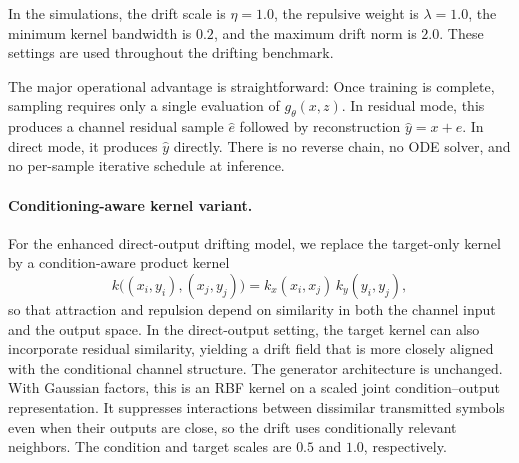 \documentclass[conference]{IEEEtran}
\begin{document}
In the simulations, the drift scale is \(\eta=1.0\), the repulsive weight is \(\lambda=1.0\), the minimum kernel bandwidth is \(0.2\), and the maximum drift norm is \(2.0\).
These settings are used throughout the drifting benchmark.

The major operational advantage is straightforward:
Once training is complete, sampling requires only a single evaluation of \(g_\theta(x,z)\).
In residual mode, this produces a channel residual sample \(\hat e\) followed by reconstruction \(\hat y=x+\hat e\). In direct mode, it produces \(\hat y\) directly.
There is no reverse chain, no ODE solver, and no per-sample iterative schedule at inference.

\paragraph{Conditioning-aware kernel variant.}
For the enhanced direct-output drifting model, we replace the target-only kernel by a condition-aware product kernel
  \[
  k\big((x_i,y_i),(x_j,y_j)\big)=k_x(x_i,x_j)\,k_y(y_i,y_j),
  \]
so that attraction and repulsion depend on similarity in both the channel input and the output space. In the direct-output setting, the target kernel can also incorporate residual similarity, yielding a drift field that is more closely aligned with the conditional channel structure. The generator architecture is unchanged.
With Gaussian factors, this is an RBF kernel on a scaled joint condition--output representation. It suppresses interactions between dissimilar transmitted symbols even when their outputs are close, so the drift uses conditionally relevant neighbors. The condition and target scales are \(0.5\) and \(1.0\), respectively.

%

%
\end{document}
